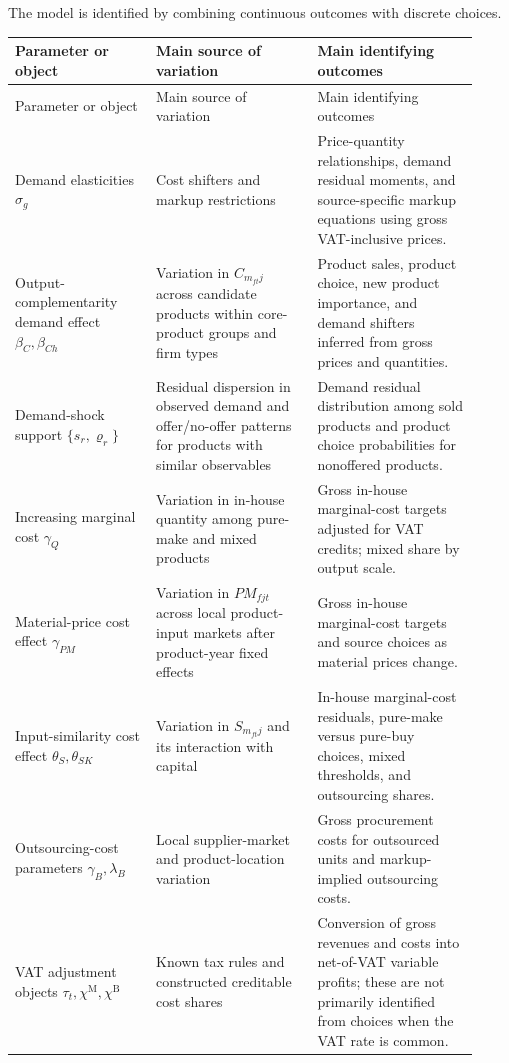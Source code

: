 \documentclass[11pt,a4paper]{article}
\newcommand{\M}{\mathrm{M}}
\newcommand{\B}{\mathrm{B}}
\begin{document}
The model is identified by combining continuous outcomes with discrete choices.

\begin{longtable}{L{0.28\linewidth}L{0.32\linewidth}L{0.32\linewidth}}
\toprule
Parameter or object & Main source of variation & Main identifying outcomes \\
\midrule
\endfirsthead
\toprule
Parameter or object & Main source of variation & Main identifying outcomes \\
\midrule
\endhead
Demand elasticities $\sigma_g$ & Cost shifters and markup restrictions & Price-quantity relationships, demand residual moments, and source-specific markup equations using gross VAT-inclusive prices. \\
\addlinespace
Output-complementarity demand effect $\beta_C,\beta_{Ch}$ & Variation in $C_{m_{ft}j}$ across candidate products within core-product groups and firm types & Product sales, product choice, new product importance, and demand shifters inferred from gross prices and quantities. \\
\addlinespace
Demand-shock support $\{s_r,\varrho_r\}$ & Residual dispersion in observed demand and offer/no-offer patterns for products with similar observables & Demand residual distribution among sold products and product choice probabilities for nonoffered products. \\
\addlinespace
Increasing marginal cost $\gamma_Q$ & Variation in in-house quantity among pure-make and mixed products & Gross in-house marginal-cost targets adjusted for VAT credits; mixed share by output scale. \\
\addlinespace
Material-price cost effect $\gamma_{PM}$ & Variation in $PM_{fjt}$ across local product-input markets after product-year fixed effects & Gross in-house marginal-cost targets and source choices as material prices change. \\
\addlinespace
Input-similarity cost effect $\theta_S,\theta_{SK}$ & Variation in $S_{m_{ft}j}$ and its interaction with capital & In-house marginal-cost residuals, pure-make versus pure-buy choices, mixed thresholds, and outsourcing shares. \\
\addlinespace
Outsourcing-cost parameters $\gamma_B,\lambda_B$ & Local supplier-market and product-location variation & Gross procurement costs for outsourced units and markup-implied outsourcing costs. \\
\addlinespace
VAT adjustment objects $\tau_t,\chi^{\M},\chi^{\B}$ & Known tax rules and constructed creditable cost shares & Conversion of gross revenues and costs into net-of-VAT variable profits; these are not primarily identified from choices when the VAT rate is common. \\

\end{longtable}
\end{document}
